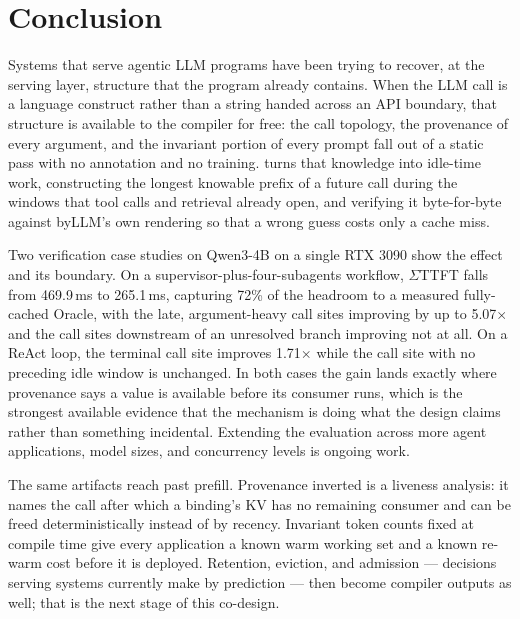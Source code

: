 \section{Conclusion}

Systems that serve agentic LLM programs have been trying to recover, at the
serving layer, structure that the program already contains. When the LLM call is a
language construct rather than a string handed across an API boundary, that
structure is available to the compiler for free: the call topology, the provenance
of every argument, and the invariant portion of every prompt fall out of a static
pass with no annotation and no training. \sysname{} turns that knowledge into idle-time
work, constructing the longest knowable prefix of a future call during the windows
that tool calls and retrieval already open, and verifying it byte-for-byte against
byLLM's own rendering so that a wrong guess costs only a cache miss.

Two verification case studies on Qwen3-4B on a single RTX 3090 show the effect and
its boundary. On a supervisor-plus-four-subagents workflow, \(\Sigma\)TTFT falls
from 469.9\,ms to 265.1\,ms, capturing 72\% of the headroom to a measured
fully-cached Oracle, with the late, argument-heavy call sites improving by up to
5.07$\times$ and the call sites downstream of an unresolved branch improving not at
all. On a ReAct loop, the terminal call site improves 1.71$\times$ while the call
site with no preceding idle window is unchanged. In both cases the gain lands
exactly where provenance says a value is available before its consumer runs, which
is the strongest available evidence that the mechanism is doing what the design
claims rather than something incidental. Extending the evaluation across more agent
applications, model sizes, and concurrency levels is ongoing work.

The same artifacts reach past prefill. Provenance inverted is a liveness
analysis: it names the call after which a binding's KV has no remaining
consumer and can be freed deterministically instead of by recency. Invariant
token counts fixed at compile time give every application a known warm working
set and a known re-warm cost before it is deployed. Retention, eviction, and
admission --- decisions serving systems currently make by prediction --- then
become compiler outputs as well; that is the next stage of this co-design.
